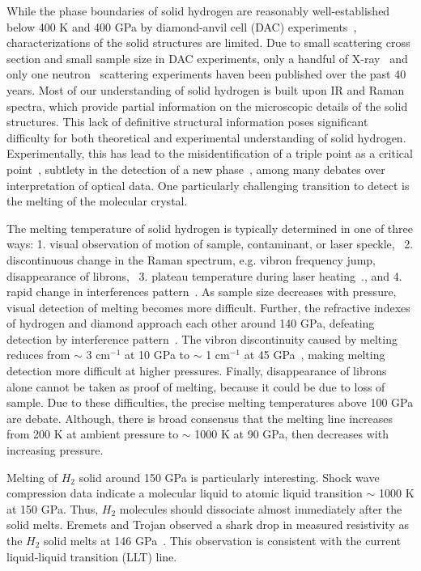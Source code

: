 While the phase boundaries of solid hydrogen are reasonably well-established below 400 K and 400 GPa by diamond-anvil cell (DAC) experiments~\cite{Dias2019}, characterizations of the solid structures are limited. Due to small scattering cross section and small sample size in DAC experiments, only a handful of X-ray~\cite{Hazen1987,MAO1988,Loubeyre1996,Kawamura2002,Goncharenko2005a,Akahama2010,Ji2019} and only one neutron~\cite{Goncharenko2005a} scattering experiments haven been published over the past 40 years. Most of our understanding of solid hydrogen is built upon IR and Raman spectra, which provide partial information on the microscopic details of the solid structures. This lack of definitive structural information poses significant difficulty for both theoretical and experimental understanding of solid hydrogen. Experimentally, this has lead to the misidentification of a triple point as a critical point~\cite{Lorenzana1990,Cui1994}, subtlety in the detection of a new phase~\cite{Eremets2009,Howie2012}, among many debates over interpretation of optical data. One particularly challenging transition to detect is the melting of the molecular crystal.

The melting temperature of solid hydrogen is typically determined in one of three ways: 1. visual observation of motion of sample, contaminant, or laser speckle,~\cite{Gregoryanz2003} 2. discontinuous change in the Raman spectrum, e.g. vibron frequency jump, disappearance of librons,~\cite{Gregoryanz2003,Subramanian2011,Zha2017} 3. plateau temperature during laser heating~\cite{Deemyad2008}., and 4. rapid change in interferences pattern~\cite{Eremets2009}.
As sample size decreases with pressure, visual detection of melting becomes more difficult. Further, the refractive indexes of hydrogen and diamond approach each other around 140 GPa, defeating detection by interference pattern~\cite{Zha2017}.
The vibron discontinuity caused by melting reduces from $\sim$ 3 cm$^{-1}$ at 10 GPa to $\sim$ 1 cm$^{-1}$ at 45 GPa~\cite{Gregoryanz2003}, making melting detection more difficult at higher pressures.
Finally, disappearance of librons alone cannot be taken as proof of melting, because it could be due to loss of sample.
Due to these difficulties, the precise melting temperatures above 100 GPa are debate. Although, there is broad consensus that the melting line increases from 200 K at ambient pressure to $\sim$ 1000 K at 90 GPa, then decreases with increasing pressure.

Melting of $H_2$ solid around 150 GPa is particularly interesting. Shock wave compression data indicate a molecular liquid to atomic liquid transition $\sim$ 1000 K at 150 GPa. Thus, $H_2$ molecules should dissociate almost immediately after the solid melts. Eremets and Trojan observed a shark drop in measured resistivity as the $H_2$ solid melts at 146 GPa~\cite{Eremets2009}. This observation is consistent with the current liquid-liquid transition (LLT) line.

